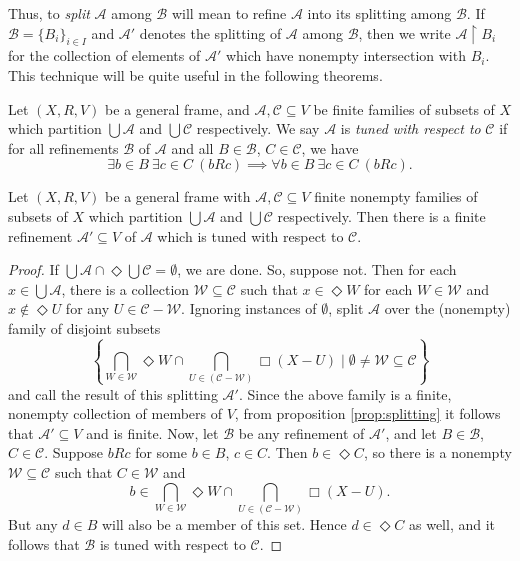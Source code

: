 \documentclass[submission]{eptcs}
\begin{document}
Thus, to \textit{split} $\mathcal{A}$ among $\mathcal{B}$ will mean to refine $\mathcal{A}$ into its splitting among $\mathcal{B}$.
If $\mathcal{B}=\{B_i\}_{i \in I}$ and $\mathcal{A}'$ denotes the splitting of $\mathcal{A}$ among $\mathcal{B}$, then we write $\mathcal{A} \restriction B_i$ for the collection of elements of $\mathcal{A}'$ which have nonempty intersection with $B_i$.
This technique will be quite useful in the following theorems. 
\par
Let $(X,R,V)$ be a general frame, and $\mathcal{A},\mathcal{C}\subseteq V$ be finite families of subsets of $X$ which partition $\bigcup\mathcal{A}$ and $\bigcup \mathcal{C}$ respectively.
We say $\mathcal{A}$ is \textit{tuned with respect to} $\mathcal{C}$ if for all refinements $\mathcal{B}$ of $\mathcal{A}$ and all $B \in \mathcal{B}$, $C \in \mathcal{C}$, we have
    \[
    \exists b \in B\ \exists c \in C \ (bRc) \implies \forall b \in B \ \exists c \in C \ (bRc).
    \]

\begin{proposition}\label{prop:exists_tuned_wrt}
    Let $(X,R,V)$ be a general frame 
    with $\mathcal{A},\mathcal{C} \subseteq V$ finite nonempty families of subsets of $X$ which partition $\bigcup\mathcal{A}$ and $\bigcup \mathcal{C}$ respectively.
    Then there is a finite refinement $\mathcal{A}'\subseteq V$ of $\mathcal{A}$ which is tuned with respect to $\mathcal{C}$.
    

\begin{proof}
    If $\bigcup\mathcal{A} \cap \Diamond\bigcup \mathcal{C}=\emptyset$, we are done. So, suppose not.
    Then for each $x \in \bigcup \mathcal{A}$, there is a collection $\mathcal{W}\subseteq\mathcal{C}$ such that $x \in \Diamond W$ for each $W\in \mathcal{W}$ and $x\notin \Diamond U$ for any $U \in \mathcal{C-W}$.
    Ignoring instances of $\emptyset$, split $\mathcal{A}$ over the (nonempty) family of disjoint subsets
    \[
    \left\{\bigcap_{W \in \mathcal{W}} \Diamond W \cap 
    \bigcap_{U\in (\mathcal{C-W})}\Box (X-U) 
    \mid \emptyset \neq \mathcal{W} \subseteq \mathcal{C}\right\} 
    \]
    and call the result of this splitting $\mathcal{A}'$. Since the above family is a finite, nonempty collection of members of $V$, from proposition \ref{prop:splitting} it follows that $\mathcal{A}' \subseteq V$ and is finite. 
    Now, let $\mathcal{B}$ be any refinement of $\mathcal{A}'$, and let $B \in \mathcal{B}$, $C \in \mathcal{C}$.
    Suppose $bRc$ for some $b \in B$, $c \in C$. Then 
    $b \in \Diamond C$, so there is a nonempty $\mathcal{W} \subseteq \mathcal{C}$ such that $C \in \mathcal{W}$ and
    \[
    b \in \bigcap_{W \in \mathcal{W}} \Diamond W \cap \bigcap_{U\in (\mathcal{C-W})}\Box (X-U).
    \]
    But any $d \in B$ will also be a member of this set. Hence $d \in \Diamond C$ as well, and it follows that $\mathcal{B}$ is tuned with respect to $\mathcal{C}$.
    
\end{proof}
    
\end{proposition}
\end{document}
